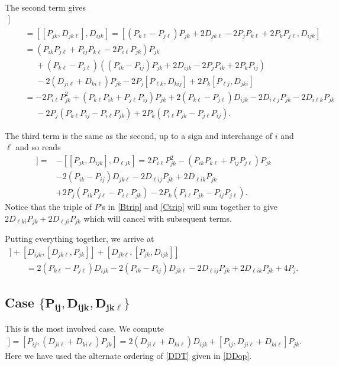 \documentclass[pdftex]{sigma}
\numberwithin{equation}{section}
\begin{document}
 The second term gives
\begin{gather*}
   [ D_{ ijk}, [D_{jk\ell}, P_{jk}]]\\
   \qquad =  [[  P_{jk},D_{ jk \ell }], D_{ijk}]
   = [ (P_{k\ell} -P_{j\ell})P_{jk} +2D_{jk\ell} -2P_jP_{k \ell}+2P_k P_{j \ell}, D_{ijk}]\nonumber \\
  \qquad = ( P_{ik}P_{j\ell}+P_{ij}P_{k \ell}-2P_{i\ell}P_{jk}) P_{jk}\nonumber \\
  \phantom{\qquad =}{}   + (P_{k \ell}-P_{j\ell})\left((P_{ik} -P_{ij})P_{jk} +2D_{ijk} -2P_jP_{ik}+2P_kP_{ij}\right) \nonumber \\
  \phantom{\qquad =}{}    - 2(D_{j i\ell}+D_{ki\ell}) P_{jk} - 2P_j[P_{\ell k},D_{kij}]+2P_k[ P_{\ell j}, D_{jki}]\nonumber\\
 \qquad =  -2P_{i\ell}P_{jk}^2 +(P_{k\ell}P_{ik}+ P_{j\ell} P_{ij}) P_{jk}
   + 2(P_{k \ell}-P_{j\ell})D_{ijk} - 2D_{i\ell j}P_{jk}- 2D_{i\ell k}P_{jk}\nonumber\\
   \phantom{\qquad =}{}    - 2P_j\left( P_{k\ell}P_{ij} -P_{i\ell}P_{jk}\right) + 2P_k\left( P_{i\ell}P_{jk} - P_{j\ell}P_{ij}\right).\label{Btrip}
   \end{gather*}

   The third term is the same as the second, up to a sign and interchange of $i$ and $\ell$ and so reads
\begin{align}
[ D_{jk\ell}, [ P_{jk}, D_{ijk}]]={}&- [[ P_{jk}, D_{ijk}], D_{\ell jk}]
 = 2P_{i\ell}P_{jk}^2 -(P_{ik}P_{k\ell}+ P_{ij} P_{j\ell}) P_{jk}\nonumber \\
 &- 2(P_{ik }-P_{ij})D_{jk\ell} - 2D_{\ell i j}P_{jk}+2D_{\ell i k}P_{jk}\nonumber\\
 & +2P_j\left( P_{ik}P_{j\ell} -P_{i\ell}P_{jk}\right) - 2P_k\left( P_{i\ell}P_{jk} - P_{ij}P_{j\ell}\right). \label{Ctrip}
\end{align}
Notice that the triple of $P$'s in \eqref{Btrip} and \eqref{Ctrip} will sum together to give $2D_{\ell ki}P_{jk}+2D_{\ell ji}P_{jk}$ which will cancel with subsequent terms.

Putting everything together, we arrive at
\begin{gather*}
 [ P_{jk}, [ D_{ ijk}, D_{jkl}]] +[ D_{ ijk}, [D_{jk\ell}, P_{jk}]] + [ D_{jk\ell}, [ P_{jk}, D_{ijk}]]\\
 \qquad = 2(P_{k \ell}-P_{j\ell})D_{ijk} - 2(P_{ik }-P_{ij})D_{jk\ell} - 2D_{\ell i j}P_{jk}+2D_{\ell i k}P_{jk} +4P_j .
 \end{gather*}

\subsection[Case \{ P\_i j , D\_ ijk, D\_ jkl\}]{Case $\boldsymbol{\{ P_{i j }, D_{ ijk}, D_{ jk\ell}\}} $}
 This is the most involved case. We compute
 \begin{gather*}
 [ P_{i j}, [ D_{ ijk}, D_{jkl}]] = [P_{ij}, (D_{ji\ell} +D_{ki\ell})P_{jk} ]
= 2 (D_{ji\ell}+D_{ki\ell})D_{ijk} + [P_{ij},D_{ji \ell} +D_{ki\ell} ]P_{jk}.
\end{gather*}
 Here we have used the alternate ordering of \eqref{DDT} given in \eqref{DDop}.
\end{document}
